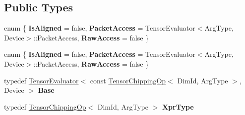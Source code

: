 \subsection*{Public Types}
\begin{DoxyCompactItemize}
\item 
\mbox{\label{struct_eigen_1_1_tensor_evaluator_3_01_tensor_chipping_op_3_01_dim_id_00_01_arg_type_01_4_00_01_device_01_4_a28d5429c81aa4677015f9f1eacda4c31}} 
enum \{ {\bfseries Is\+Aligned} = false, 
{\bfseries Packet\+Access} = Tensor\+Evaluator$<$Arg\+Type, Device$>$\+:\+:Packet\+Access, 
{\bfseries Raw\+Access} = false
 \}
\item 
\mbox{\label{struct_eigen_1_1_tensor_evaluator_3_01_tensor_chipping_op_3_01_dim_id_00_01_arg_type_01_4_00_01_device_01_4_a57fdc7107aafdf649a5f6fff5bfc0893}} 
enum \{ {\bfseries Is\+Aligned} = false, 
{\bfseries Packet\+Access} = Tensor\+Evaluator$<$Arg\+Type, Device$>$\+:\+:Packet\+Access, 
{\bfseries Raw\+Access} = false
 \}
\item 
\mbox{\label{struct_eigen_1_1_tensor_evaluator_3_01_tensor_chipping_op_3_01_dim_id_00_01_arg_type_01_4_00_01_device_01_4_a284c128337eb230c285e1c5ef7f31a98}} 
typedef \hyperlink{struct_eigen_1_1_tensor_evaluator}{Tensor\+Evaluator}$<$ const \hyperlink{class_eigen_1_1_tensor_chipping_op}{Tensor\+Chipping\+Op}$<$ Dim\+Id, Arg\+Type $>$, Device $>$ {\bfseries Base}
\item 
\mbox{\label{struct_eigen_1_1_tensor_evaluator_3_01_tensor_chipping_op_3_01_dim_id_00_01_arg_type_01_4_00_01_device_01_4_a907f3ac5a95588e64dcc638f15372228}} 
typedef \hyperlink{class_eigen_1_1_tensor_chipping_op}{Tensor\+Chipping\+Op}$<$ Dim\+Id, Arg\+Type $>$ {\bfseries Xpr\+Type}
\item 
\mbox{\label{struct_eigen_1_1_tensor_evaluator_3_01_tensor_chipping_op_3_01_dim_id_00_01_arg_type_01_4_00_01_device_01_4_acdab0e2e746a637e255a49da3b287329}} 

\end{DoxyCompactItemize}
